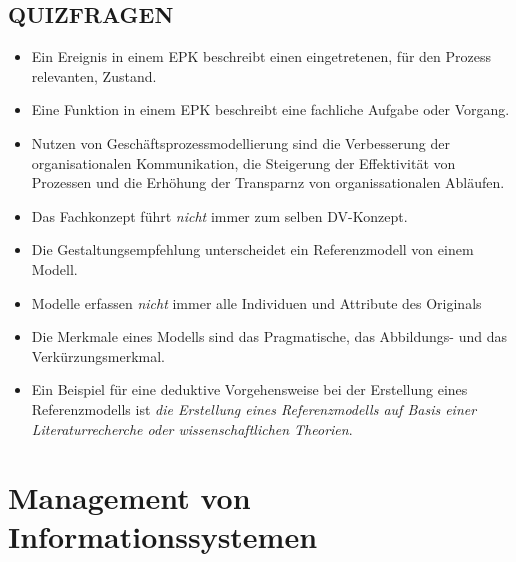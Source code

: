 \documentclass[12pt,a4paper]{article}
\begin{document}
\subsection{QUIZFRAGEN} %
\begin{itemize}
   \item Ein Ereignis in einem EPK beschreibt einen eingetretenen, für den Prozess relevanten, Zustand.
   \item Eine Funktion in einem EPK beschreibt eine fachliche Aufgabe oder Vorgang.
   
   \item Nutzen von Geschäftsprozessmodellierung sind die Verbesserung der organisationalen Kommunikation, die Steigerung der Effektivität von Prozessen und die Erhöhung der Transparnz von organissationalen Abläufen.
   
   \item Das Fachkonzept führt \emph{nicht} immer zum selben DV-Konzept.
   
   \item Die Gestaltungsempfehlung unterscheidet ein Referenzmodell von einem Modell.
   \item Modelle erfassen \emph{nicht} immer alle Individuen und Attribute des Originals
   \item Die Merkmale eines Modells sind das Pragmatische, das Abbildungs- und das Ver\-kürz\-ungs\-merk\-mal.
   
   \item Ein Beispiel für eine deduktive Vorgehensweise bei der Erstellung eines Referenzmodells ist \emph{die Erstellung eines Referenzmodells auf Basis einer Literaturrecherche oder wissenschaftlichen Theorien}.
\end{itemize}


\newpage
\section{Management von Informationssystemen}

\vspace{0.5cm}
\end{document}
